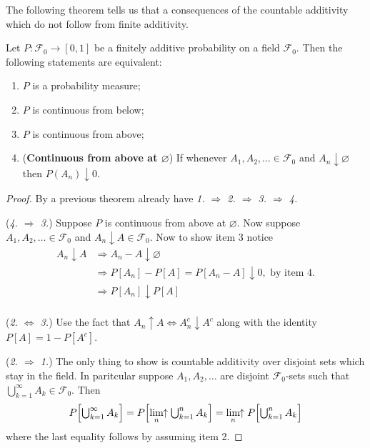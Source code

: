 The following theorem tells us that a consequences of the countable additivity which do not follow from finite additivity.


\begin{theorem}
\label{thm: cae}
Let $P:\mathcal F_0\rightarrow [0,1]$ be a finitely additive probability on a field $\mathcal F_0$. Then the following statements are equivalent:
\begin{enumerate}
\item $P$ is a probability measure;
\item $P$ is continuous from below;
\item $P$ is continuous from above;
\item ({\bf Continuous from above at $\varnothing$}) If whenever $A_1, A_2, \ldots \in \mathcal F_0$ and $A_n\downarrow  \varnothing$ then $P(A_n)\downarrow 0$.
\end{enumerate}
\end{theorem}
\begin{proof}

By a previous theorem already have {\sl 1. $\Longrightarrow $ 2. $\Longrightarrow $ 3. $\Longrightarrow $ 4. }



 ({\sl 4. $\Longrightarrow $ 3.}) Suppose $P$ is continuous from above at $\varnothing$. Now suppose  $A_1, A_2, \ldots \in \mathcal F_0$ and $A_n\downarrow A\in\mathcal F_0$. Now to show item 3 notice
 \begin{align*}
 A_n\downarrow A
 &\Longrightarrow A_n-A \downarrow \varnothing \\
 &\Longrightarrow P[A_n]-P[A] = P[A_n-A]   \downarrow 0,\,\,\text{by item 4.} \\
 &\Longrightarrow P[A_n] \downarrow P[A]  \\
 \end{align*}


 ({\sl 2. $\Longleftrightarrow $ 3.}) Use the fact that $A_n\uparrow A \Longleftrightarrow A_n^c \downarrow A^c$ along with the identity $P[A] = 1- P[A^c]$.


({\sl 2. $\Longrightarrow $ 1.}) The only thing to show is countable additivity over disjoint sets which stay in the field. In paritcular suppose $A_1, A_2, \ldots $ are disjoint $\mathcal F_0$-sets  such that $\textstyle\bigcup_{k=1}^\infty A_k \in \mathcal F_0$. Then
\begin{align*}
P\Bigl[\textstyle\bigcup_{k=1}^\infty A_k \Bigr]= P\Bigl[\displaystyle\lim_{n}\!\!\uparrow\textstyle\bigcup_{k=1}^n A_k \Bigr] = \displaystyle\lim_{n}\!\!\uparrow P\Bigl[\textstyle\bigcup_{k=1}^n A_k \Bigr]
 \end{align*}
 where the last equality follows by assuming item 2.


\end{proof}





